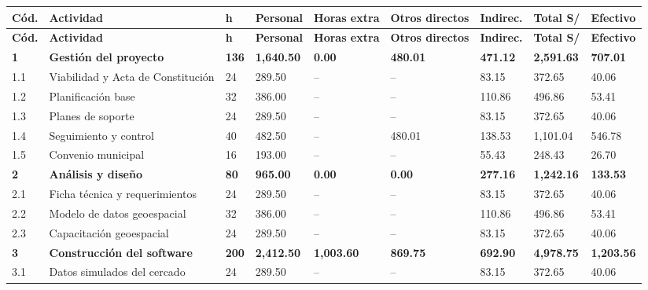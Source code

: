 \documentclass[11pt,a4paper]{article}
\begin{document}
\vspace{0.1cm}
{\footnotesize
\setlength{\tabcolsep}{3pt}
\begin{longtable}{@{}P{0.8cm} >{\raggedright\arraybackslash}p{3.65cm} Q{0.6cm} Q{1.45cm} Q{1.35cm} Q{1.45cm} Q{1.4cm} Q{1.65cm} Q{1.45cm}@{}}
\toprule
{}
\textbf{Cód.} & \textbf{Actividad} & \textbf{h} & \textbf{Personal} & \textbf{Horas extra} & \textbf{Otros directos} & \textbf{Indirec.} & \textbf{Total S/} & \textbf{Efectivo} \\
\midrule
\endfirsthead
\toprule
{}
\textbf{Cód.} & \textbf{Actividad} & \textbf{h} & \textbf{Personal} & \textbf{Horas extra} & \textbf{Otros directos} & \textbf{Indirec.} & \textbf{Total S/} & \textbf{Efectivo} \\
\midrule
\endhead
\bottomrule
\endfoot
{}
\textbf{1} & \textbf{\textcolor{Rama1}{Gestión del proyecto}} & \textbf{136} & \textbf{1,640.50} & \textbf{0.00} & \textbf{480.01} & \textbf{471.12} & \textbf{2,591.63} & \textbf{707.01} \\
1.1 & Viabilidad y Acta de Constitución & 24 & 289.50 & -- & -- & 83.15 & 372.65 & 40.06 \\
1.2 & Planificación base & 32 & 386.00 & -- & -- & 110.86 & 496.86 & 53.41 \\
1.3 & Planes de soporte & 24 & 289.50 & -- & -- & 83.15 & 372.65 & 40.06 \\
1.4 & Seguimiento y control & 40 & 482.50 & -- & 480.01 & 138.53 & 1,101.04 & 546.78 \\
1.5 & Convenio municipal & 16 & 193.00 & -- & -- & 55.43 & 248.43 & 26.70 \\
\textbf{2} & \textbf{\textcolor{Rama2}{Análisis y diseño}} & \textbf{80} & \textbf{965.00} & \textbf{0.00} & \textbf{0.00} & \textbf{277.16} & \textbf{1,242.16} & \textbf{133.53} \\
2.1 & Ficha técnica y requerimientos & 24 & 289.50 & -- & -- & 83.15 & 372.65 & 40.06 \\
2.2 & Modelo de datos geoespacial & 32 & 386.00 & -- & -- & 110.86 & 496.86 & 53.41 \\
2.3 & Capacitación geoespacial & 24 & 289.50 & -- & -- & 83.15 & 372.65 & 40.06 \\
\textbf{3} & \textbf{\textcolor{Rama3}{Construcción del software}} & \textbf{200} & \textbf{2,412.50} & \textbf{1,003.60} & \textbf{869.75} & \textbf{692.90} & \textbf{4,978.75} & \textbf{1,203.56} \\
3.1 & Datos simulados del cercado & 24 & 289.50 & -- & -- & 83.15 & 372.65 & 40.06 \\

\end{longtable}}
\end{document}
